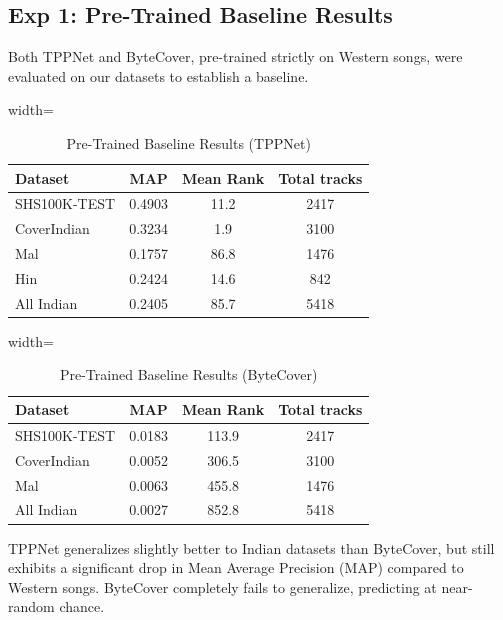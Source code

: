 \documentclass[conference]{IEEEtran}
\begin{document}
\subsection{Exp 1: Pre-Trained Baseline Results}
Both TPPNet and ByteCover, pre-trained strictly on Western songs, were evaluated on our datasets to establish a baseline.

\begin{table}[htbp]
    \caption{Pre-Trained Baseline Results (TPPNet)}
    \centering
    \begin{adjustbox}{width=\columnwidth}
    \begin{tabular}{lccc}
    \toprule
    \textbf{Dataset} & \textbf{MAP} & \textbf{Mean Rank} & \textbf{Total tracks} \\
    \midrule
    SHS100K-TEST & 0.4903 & 11.2 & 2417 \\
    CoverIndian  & 0.3234 & 1.9 & 3100 \\
    Mal          & 0.1757 & 86.8 & 1476 \\
    Hin          & 0.2424 & 14.6 & 842 \\
    All Indian   & 0.2405 & 85.7 & 5418 \\
    \bottomrule
    \end{tabular}
    \end{adjustbox}
\end{table}

\begin{table}[htbp]
    \caption{Pre-Trained Baseline Results (ByteCover)}
    \centering
    \begin{adjustbox}{width=\columnwidth}
    \begin{tabular}{lccc}
    \toprule
    \textbf{Dataset} & \textbf{MAP} & \textbf{Mean Rank} & \textbf{Total tracks} \\
    \midrule
    SHS100K-TEST & 0.0183 & 113.9 & 2417 \\
    CoverIndian  & 0.0052 & 306.5 & 3100 \\
    Mal          & 0.0063 & 455.8 & 1476 \\
    All Indian   & 0.0027 & 852.8 & 5418 \\
    \bottomrule
    \end{tabular}
    \end{adjustbox}
\end{table}
 TPPNet generalizes slightly better to Indian datasets than ByteCover, but still exhibits a significant drop in Mean Average Precision (MAP) compared to Western songs. ByteCover completely fails to generalize, predicting at near-random chance.
\end{document}
